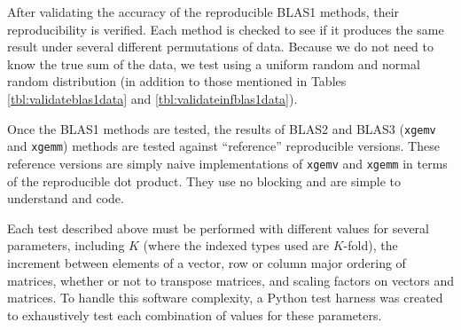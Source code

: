   After validating the accuracy of the reproducible BLAS1 methods, their reproducibility is verified. Each method is checked to see if it produces the same result under several different permutations of data. Because we do not need to know the true sum of the data, we test using a uniform random and normal random distribution (in addition to those mentioned in Tables \ref{tbl:validateblas1data} and \ref{tbl:validateinfblas1data}).

  Once the BLAS1 methods are tested, the results of BLAS2 and BLAS3 (\texttt{xgemv} and \texttt{xgemm}) methods are tested against ``reference'' reproducible versions. These reference versions are simply naive implementations of \texttt{xgemv} and \texttt{xgemm} in terms of the reproducible dot product. They use no blocking and are simple to understand and code.

  Each test described above must be performed with different values for several parameters, including $K$ (where the indexed types used are $K$-fold), the increment between elements of a vector, row or column major ordering of matrices, whether or not to transpose matrices, and scaling factors on vectors and matrices. To handle this software complexity, a Python test harness was created to exhaustively test each combination of values for these parameters.
